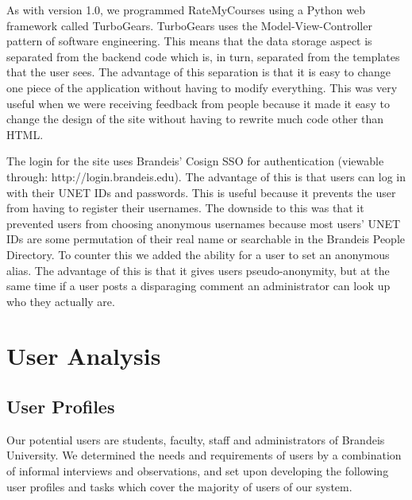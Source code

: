 \documentclass[12pt]{report}
\begin{document}
As with version 1.0, we programmed RateMyCourses using a Python web framework called TurboGears.  TurboGears uses the Model-View-Controller pattern of software engineering.  This means that the data storage aspect is separated from the backend code which is, in turn, separated from the templates that the user sees.  The advantage of this separation is that it is easy to change one piece of the application without having to modify everything.  This was very useful when we were receiving feedback from people because it made it easy to change the design of the site without having to rewrite much code other than HTML.

The login for the site uses Brandeis' Cosign SSO for authentication (viewable through: http://login.brandeis.edu).  The advantage of this is that users can log in with their UNET IDs and passwords.  This is useful because it prevents the user from having to register their usernames.  The downside to this was that it prevented users from choosing anonymous usernames because most users' UNET IDs are some permutation of their real name or searchable in the Brandeis People Directory.  To counter this we added the ability for a user to set an anonymous alias.  The advantage of this is that it gives users pseudo-anonymity, but at the same time if a user posts a disparaging comment an administrator can look up who they actually are.


\chapter{User Analysis}

\section{User Profiles}
Our potential users are students, faculty, staff and administrators of Brandeis University. We determined the needs and requirements of users by a combination of informal interviews and observations, and set upon developing the following user profiles and tasks which cover the majority of users of our system.
\end{document}
